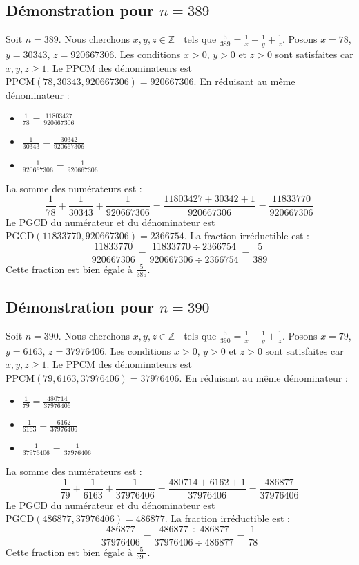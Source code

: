 \documentclass[11pt,a4paper]{article}
\begin{document}
\subsection{Démonstration pour $n = 389$}
Soit $n = 389$. Nous cherchons $x, y, z \in \mathbb{Z}^{+}$ tels que $\frac{5}{389} = \frac{1}{x} + \frac{1}{y} + \frac{1}{z}$.
Posons $x = 78$, $y = 30343$, $z = 920667306$.
Les conditions $x > 0$, $y > 0$ et $z > 0$ sont satisfaites car $x, y, z \geq 1$.
Le PPCM des dénominateurs est $\text{PPCM}(78, 30343, 920667306) = 920667306$.
En réduisant au même dénominateur :
\begin{itemize}
    \item $\frac{1}{78} = \frac{11803427}{920667306}$
    \item $\frac{1}{30343} = \frac{30342}{920667306}$
    \item $\frac{1}{920667306} = \frac{1}{920667306}$
\end{itemize}
La somme des numérateurs est :
$$ \frac{1}{78} + \frac{1}{30343} + \frac{1}{920667306} = \frac{11803427 + 30342 + 1}{920667306} = \frac{11833770}{920667306} $$
Le PGCD du numérateur et du dénominateur est $\text{PGCD}(11833770, 920667306) = 2366754$.
La fraction irréductible est :
$$ \frac{11833770}{920667306} = \frac{11833770 \div 2366754}{920667306 \div 2366754} = \frac{5}{389} $$
Cette fraction est bien égale à $\frac{5}{389}$.

\subsection{Démonstration pour $n = 390$}
Soit $n = 390$. Nous cherchons $x, y, z \in \mathbb{Z}^{+}$ tels que $\frac{5}{390} = \frac{1}{x} + \frac{1}{y} + \frac{1}{z}$.
Posons $x = 79$, $y = 6163$, $z = 37976406$.
Les conditions $x > 0$, $y > 0$ et $z > 0$ sont satisfaites car $x, y, z \geq 1$.
Le PPCM des dénominateurs est $\text{PPCM}(79, 6163, 37976406) = 37976406$.
En réduisant au même dénominateur :
\begin{itemize}
    \item $\frac{1}{79} = \frac{480714}{37976406}$
    \item $\frac{1}{6163} = \frac{6162}{37976406}$
    \item $\frac{1}{37976406} = \frac{1}{37976406}$
\end{itemize}
La somme des numérateurs est :
$$ \frac{1}{79} + \frac{1}{6163} + \frac{1}{37976406} = \frac{480714 + 6162 + 1}{37976406} = \frac{486877}{37976406} $$
Le PGCD du numérateur et du dénominateur est $\text{PGCD}(486877, 37976406) = 486877$.
La fraction irréductible est :
$$ \frac{486877}{37976406} = \frac{486877 \div 486877}{37976406 \div 486877} = \frac{1}{78} $$
Cette fraction est bien égale à $\frac{5}{390}$.
\end{document}
